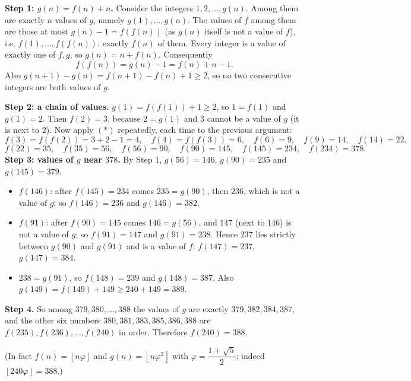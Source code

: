 \textbf{Step 1: $g(n)=f(n)+n$.} Consider the integers $1,2,\dots,g(n)$. Among them are exactly $n$ values of $g$, namely $g(1),\dots,g(n)$. The values of $f$ among them are those at most $g(n)-1=f(f(n))$ (as $g(n)$ itself is not a value of $f$), i.e. $f(1),\dots,f(f(n))$: exactly $f(n)$ of them. Every integer is a value of exactly one of $f,g$, so $g(n)=n+f(n)$. Consequently
\[f(f(n))=g(n)-1=f(n)+n-1.\tag{$*$}\]
Also $g(n+1)-g(n)=f(n+1)-f(n)+1\ge2$, so no two consecutive integers are both values of $g$.

\textbf{Step 2: a chain of values.} $g(1)=f(f(1))+1\ge2$, so $1=f(1)$ and $g(1)=2$. Then $f(2)=3$, because $2=g(1)$ and $3$ cannot be a value of $g$ (it is next to $2$). Now apply $(*)$ repeatedly, each time to the previous argument:
\[f(3)=f(f(2))=3+2-1=4,\quad f(4)=f(f(3))=6,\quad f(6)=9,\quad f(9)=14,\quad f(14)=22,\]
\[f(22)=35,\quad f(35)=56,\quad f(56)=90,\quad f(90)=145,\quad f(145)=234,\quad f(234)=378.\]
\textbf{Step 3: values of $g$ near $378$.} By Step 1, $g(56)=146$, $g(90)=235$ and $g(145)=379$.
\begin{itemize}
\item $f(146)$: after $f(145)=234$ comes $235=g(90)$, then $236$, which is not a value of $g$; so $f(146)=236$ and $g(146)=382$.
\item $f(91)$: after $f(90)=145$ comes $146=g(56)$, and $147$ (next to $146$) is not a value of $g$; so $f(91)=147$ and $g(91)=238$. Hence $237$ lies strictly between $g(90)$ and $g(91)$ and is a value of $f$: $f(147)=237$, $g(147)=384$.
\item $238=g(91)$, so $f(148)=239$ and $g(148)=387$. Also $g(149)=f(149)+149\ge240+149=389$.
\end{itemize}
\textbf{Step 4.} So among $379,380,\dots,388$ the values of $g$ are exactly $379,382,384,387$, and the other six numbers $380,381,383,385,386,388$ are $f(235),f(236),\dots,f(240)$ in order. Therefore $f(240)=\boxed{388}$.

(In fact $f(n)=\left\lfloor n\varphi\right\rfloor$ and $g(n)=\left\lfloor n\varphi^2\right\rfloor$ with $\varphi=\dfrac{1+\sqrt5}2$; indeed $\left\lfloor240\varphi\right\rfloor=388$.)
